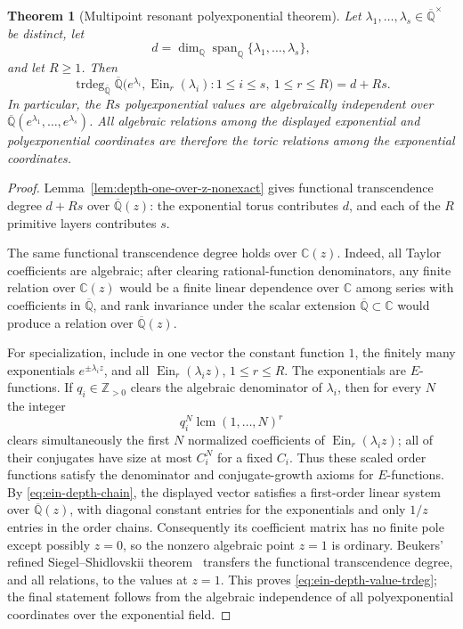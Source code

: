 \documentclass[11pt]{article}
\newtheorem{theorem}{Theorem}[section]
\theoremstyle{definition}
\theoremstyle{remark}
\newcommand{\Q}{\mathbb Q}
\newcommand{\Qbar}{\overline{\mathbb Q}}
\newcommand{\C}{\mathbb C}
\newcommand{\EinDepth}[1]{\operatorname{Ein}_{#1}}
\begin{document}
\begin{theorem}[Multipoint resonant polyexponential theorem]
\label{thm:ein-depth-multipoint}
Let \(\lambda_1,\ldots,\lambda_s\in\Qbar^\times\) be distinct, let
\[
 d=\dim_{\Q}\operatorname{span}_{\Q}
   \{\lambda_1,\ldots,\lambda_s\},
\]
and let \(R\geq1\).  Then
\begin{equation}\label{eq:ein-depth-value-trdeg}
 \operatorname{trdeg}_{\Qbar}
 \Qbar\bigl(
   e^{\lambda_i},\EinDepth{r}(\lambda_i):
   1\leq i\leq s,\ 1\leq r\leq R
 \bigr)
 =d+Rs.
\end{equation}
In particular, the \(Rs\) polyexponential values are algebraically independent over
\(\Qbar(e^{\lambda_1},\ldots,e^{\lambda_s})\).  All algebraic relations
among the displayed exponential and polyexponential coordinates are therefore the
toric relations among the exponential coordinates.
\end{theorem}

\begin{proof}
Lemma~\ref{lem:depth-one-over-z-nonexact} gives functional transcendence
degree \(d+Rs\) over \(\Qbar(z)\): the exponential torus contributes
\(d\), and each of the \(R\) primitive layers contributes \(s\).

The same functional transcendence degree holds over \(\C(z)\).  Indeed,
all Taylor coefficients are algebraic; after clearing rational-function
denominators, any finite relation over \(\C(z)\) would be a finite linear
dependence over \(\C\) among series with coefficients in \(\Qbar\), and
rank invariance under the scalar extension \(\Qbar\subset\C\) would produce
a relation over \(\Qbar(z)\).

For specialization, include in one vector the constant function \(1\),
the finitely many exponentials \(e^{\pm\lambda_i z}\), and all
\(\EinDepth{r}(\lambda_i z)\), \(1\leq r\leq R\).  The exponentials are
\(E\)-functions.  If \(q_i\in\mathbb Z_{>0}\) clears the algebraic
denominator of \(\lambda_i\), then for every \(N\) the integer
\[
 q_i^N\operatorname{lcm}(1,\ldots,N)^r
\]
clears simultaneously the first \(N\) normalized coefficients of
\(\EinDepth{r}(\lambda_i z)\); all of their conjugates have size at most
\(C_i^N\) for a fixed \(C_i\).  Thus these scaled order functions satisfy
the denominator and conjugate-growth axioms for \(E\)-functions.  By
\eqref{eq:ein-depth-chain}, the displayed vector satisfies a first-order
linear system over \(\Qbar(z)\), with diagonal constant entries for the
exponentials and only \(1/z\) entries in the order chains.  Consequently
its coefficient matrix has no finite pole except possibly \(z=0\), so the
nonzero algebraic point \(z=1\) is ordinary.  Beukers'
refined Siegel--Shidlovskii theorem~\cite{Beukers2006} transfers the functional
transcendence degree, and all relations, to the values at \(z=1\).  This
proves \eqref{eq:ein-depth-value-trdeg}; the final statement follows from
the algebraic independence of all polyexponential coordinates over the exponential
field.
\end{proof}
\end{document}

